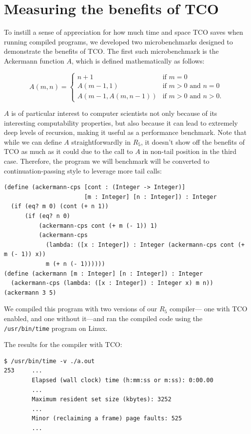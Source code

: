 \documentclass[12pt]{article}
\begin{document}
\section{Measuring the benefits of TCO}

To instill a sense of appreciation for how much time and space TCO saves when running
compiled programs, we developed two microbenchmarks designed to demonstrate the benefits
of TCO. The first such microbenchmark is the Ackermann function $A$, which is defined
mathematically as follows:

$$
A(m, n) = \begin{cases}
  n+1               & \mbox{if } m = 0 \\
  A(m-1, 1)         & \mbox{if } m > 0 \mbox{ and } n = 0 \\
  A(m-1, A(m, n-1)) & \mbox{if } m > 0 \mbox{ and } n > 0.
\end{cases}
$$

$A$ is of particular interest to computer scientists not only
because of its interesting computability properties, but also because it can lead
to extremely deep levels of recursion, making it useful as a performance benchmark.
Note that while we can define $A$ straightforwardly in $R_5$, it doesn't show off
the benefits of TCO as much as it could due to the call to $A$ in non-tail position
in the third case. Therefore, the program we will benchmark will be converted
to continuation-passing style to leverage more tail calls:

\begin{verbatim}
(define (ackermann-cps [cont : (Integer -> Integer)]
                       [m : Integer] [n : Integer]) : Integer
  (if (eq? m 0) (cont (+ n 1))
      (if (eq? n 0)
          (ackermann-cps cont (+ m (- 1)) 1)
          (ackermann-cps
            (lambda: ([x : Integer]) : Integer (ackermann-cps cont (+ m (- 1)) x))
            m (+ n (- 1))))))
(define (ackermann [m : Integer] [n : Integer]) : Integer
  (ackermann-cps (lambda: ([x : Integer]) : Integer x) m n))
(ackermann 3 5)
\end{verbatim}

We compiled this program with two versions of our $R_5$ compiler---
one with TCO enabled, and one without it---and ran the compiled code
using the \verb+/usr/bin/time+ program on Linux.

The results for the compiler with TCO:

\begin{verbatim}
$ /usr/bin/time -v ./a.out 
253     ...
        Elapsed (wall clock) time (h:mm:ss or m:ss): 0:00.00
        ...
        Maximum resident set size (kbytes): 3252
        ...
        Minor (reclaiming a frame) page faults: 525
        ...
\end{verbatim}
\end{document}
